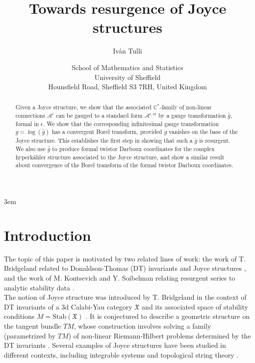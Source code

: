 \documentclass{article}
\title{Towards resurgence of Joyce structures}
\date{\small School of Mathematics and Statistics\\ University of Sheffield\\
Hounsfield Road, Sheffield S3 7RH, United Kingdom}
\author{Iv\'an Tulli}
\theoremstyle{definition}
\numberwithin{equation}{section}
\begin{document}
\emergencystretch 3em
\maketitle
\begin{abstract}
    Given a Joyce structure, we show that the associated $\mathbb{C}^*$-family of non-linear connections $\mathcal{A}^{\epsilon}$ can be gauged to a standard form $\mathcal{A}^{\epsilon,\text{st}}$ by a gauge transformation $\hat{g}$, formal in $\epsilon$. We show that the corresponding infinitesimal gauge transformation $\dot{g}=\log(\hat{g})$ has a convergent Borel transform, provided $\dot{g}$ vanishes on the base of the Joyce structure.  This establishes the first step in showing that such a $\dot{g}$ is resurgent. We also use $\hat{g}$ to produce formal twistor Darboux coordinates for the complex hyperk\"{a}hler structure associated to the Joyce structure, and show a similar result about convergence of the Borel transform of the formal twistor Darboux coordinates.  
\end{abstract}

\tableofcontents
\section{Introduction}

The topic of this paper is motivated by two related lines of work: the work of T. Bridgeland related to Donaldson-Thomas (DT) invariants and Joyce structures \cite{BridgeJoyce, TwistorJoyce}, and the work of M. Kontsevich and Y. Soibelman relating resurgent series to analytic stability data \cite{KSresurgence}.\\


The notion of Joyce structure was introduced by T. Bridgeland \cite{BridgeJoyce} in the context of DT invariants of a 3d Calabi-Yau category $\mathfrak{X}$ and its associated space of stability conditions $M=\text{Stab}(\mathfrak{X})$ \cite{BridgeStab}. It is conjectured to describe a geometric structure on the tangent bundle $TM$, whose construction involves solving a family (parametrized by $TM$) of non-linear Riemann-Hilbert problems determined by the DT invariants \cite{varBPS}. Several examples of Joyce structures have been studied in different contexts, including integrable systems and topological string theory \cite{BridgeJoyce, BridgeFab, JoyceQuad, BridgelandOsc, DunakTimJoyce, TimJoyce, Alexandrov_2021, Alexandrov_2021_con}.  \\
\end{document}
